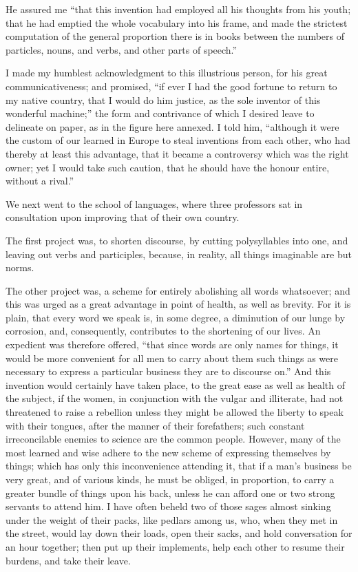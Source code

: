 \documentclass[12pt]{article}
\begin{document}
He assured me “that this invention had employed all his thoughts from his youth; that he had emptied the whole vocabulary into his frame, and made the strictest computation of the general proportion there is in books between the numbers of particles, nouns, and verbs, and other parts of speech.”

I made my humblest acknowledgment to this illustrious person, for his great communicativeness; and promised, “if ever I had the good fortune to return to my native country, that I would do him justice, as the sole inventor of this wonderful machine;” the form and contrivance of which I desired leave to delineate on paper, as in the figure here annexed.  I told him, “although it were the custom of our learned in Europe to steal inventions from each other, who had thereby at least this advantage, that it became a controversy which was the right owner; yet I would take such caution, that he should have the honour entire, without a rival.”

We next went to the school of languages, where three professors sat in consultation upon improving that of their own country.

The first project was, to shorten discourse, by cutting polysyllables into one, and leaving out verbs and participles, because, in reality, all things imaginable are but norms.

The other project was, a scheme for entirely abolishing all words whatsoever; and this was urged as a great advantage in point of health, as well as brevity.  For it is plain, that every word we speak is, in some degree, a diminution of our lunge by corrosion, and, consequently, contributes to the shortening of our lives.  An expedient was therefore offered, “that since words are only names for things, it would be more convenient for all men to carry about them such things as were necessary to express a particular business they are to discourse on.”  And this invention would certainly have taken place, to the great ease as well as health of the subject, if the women, in conjunction with the vulgar and illiterate, had not threatened to raise a rebellion unless they might be allowed the liberty to speak with their tongues, after the manner of their forefathers; such constant irreconcilable enemies to science are the common people.  However, many of the most learned and wise adhere to the new scheme of expressing themselves by things; which has only this inconvenience attending it, that if a man’s business be very great, and of various kinds, he must be obliged, in proportion, to carry a greater bundle of things upon his back, unless he can afford one or two strong servants to attend him.  I have often beheld two of those sages almost sinking under the weight of their packs, like pedlars among us, who, when they met in the street, would lay down their loads, open their sacks, and hold conversation for an hour together; then put up their implements, help each other to resume their burdens, and take their leave.
\end{document}
